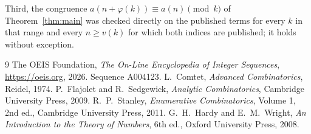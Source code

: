 \documentclass[11pt,a4paper]{article}
\theoremstyle{plain}
\theoremstyle{definition}
\begin{document}
Third, the congruence $a(n+\varphi(k))\equiv a(n)\pmod k$ of Theorem~\ref{thm:main} was
checked directly on the published terms for every $k$ in that range and every $n\ge v(k)$
for which both indices are published; it holds without exception.

\begin{thebibliography}{9}
 The OEIS Foundation, \emph{The On-Line Encyclopedia of Integer
Sequences}, \url{https://oeis.org}, 2026. Sequence A004123.
 L.~Comtet, \emph{Advanced Combinatorics}, Reidel, 1974.
 P.~Flajolet and R.~Sedgewick, \emph{Analytic Combinatorics}, Cambridge
University Press, 2009.
 R.~P.~Stanley, \emph{Enumerative Combinatorics}, Volume 1, 2nd ed.,
Cambridge University Press, 2011.
 G.~H.~Hardy and E.~M.~Wright, \emph{An Introduction to the Theory of
Numbers}, 6th ed., Oxford University Press, 2008.
\end{thebibliography}
\end{document}
